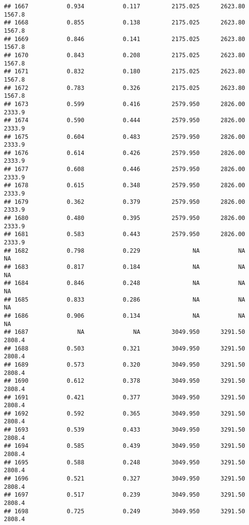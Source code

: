 \documentclass[
]{article}
\begin{document}
\begin{verbatim}
## 1667           0.934           0.117         2175.025      2623.80       1567.8
## 1668           0.855           0.138         2175.025      2623.80       1567.8
## 1669           0.846           0.141         2175.025      2623.80       1567.8
## 1670           0.843           0.208         2175.025      2623.80       1567.8
## 1671           0.832           0.180         2175.025      2623.80       1567.8
## 1672           0.783           0.326         2175.025      2623.80       1567.8
## 1673           0.599           0.416         2579.950      2826.00       2333.9
## 1674           0.590           0.444         2579.950      2826.00       2333.9
## 1675           0.604           0.483         2579.950      2826.00       2333.9
## 1676           0.614           0.426         2579.950      2826.00       2333.9
## 1677           0.608           0.446         2579.950      2826.00       2333.9
## 1678           0.615           0.348         2579.950      2826.00       2333.9
## 1679           0.362           0.379         2579.950      2826.00       2333.9
## 1680           0.480           0.395         2579.950      2826.00       2333.9
## 1681           0.583           0.443         2579.950      2826.00       2333.9
## 1682           0.798           0.229               NA           NA           NA
## 1683           0.817           0.184               NA           NA           NA
## 1684           0.846           0.248               NA           NA           NA
## 1685           0.833           0.286               NA           NA           NA
## 1686           0.906           0.134               NA           NA           NA
## 1687              NA              NA         3049.950      3291.50       2808.4
## 1688           0.503           0.321         3049.950      3291.50       2808.4
## 1689           0.573           0.320         3049.950      3291.50       2808.4
## 1690           0.612           0.378         3049.950      3291.50       2808.4
## 1691           0.421           0.377         3049.950      3291.50       2808.4
## 1692           0.592           0.365         3049.950      3291.50       2808.4
## 1693           0.539           0.433         3049.950      3291.50       2808.4
## 1694           0.585           0.439         3049.950      3291.50       2808.4
## 1695           0.588           0.248         3049.950      3291.50       2808.4
## 1696           0.521           0.327         3049.950      3291.50       2808.4
## 1697           0.517           0.239         3049.950      3291.50       2808.4
## 1698           0.725           0.249         3049.950      3291.50       2808.4

\end{verbatim}
\end{document}
